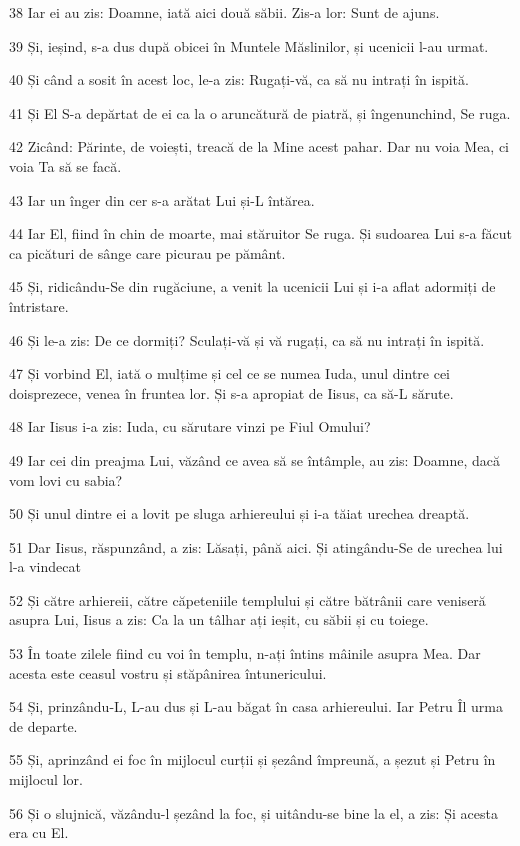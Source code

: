 \par 38 Iar ei au zis: Doamne, iată aici două săbii. Zis-a lor: Sunt de ajuns.
\par 39 Și, ieșind, s-a dus după obicei în Muntele Măslinilor, și ucenicii l-au urmat.
\par 40 Și când a sosit în acest loc, le-a zis: Rugați-vă, ca să nu intrați în ispită.
\par 41 Și El S-a depărtat de ei ca la o aruncătură de piatră, și îngenunchind, Se ruga.
\par 42 Zicând: Părinte, de voiești, treacă de la Mine acest pahar. Dar nu voia Mea, ci voia Ta să se facă.
\par 43 Iar un înger din cer s-a arătat Lui și-L întărea.
\par 44 Iar El, fiind în chin de moarte, mai stăruitor Se ruga. Și sudoarea Lui s-a făcut ca picături de sânge care picurau pe pământ.
\par 45 Și, ridicându-Se din rugăciune, a venit la ucenicii Lui și i-a aflat adormiți de întristare.
\par 46 Și le-a zis: De ce dormiți? Sculați-vă și vă rugați, ca să nu intrați în ispită.
\par 47 Și vorbind El, iată o mulțime și cel ce se numea Iuda, unul dintre cei doisprezece, venea în fruntea lor. Și s-a apropiat de Iisus, ca să-L sărute.
\par 48 Iar Iisus i-a zis: Iuda, cu sărutare vinzi pe Fiul Omului?
\par 49 Iar cei din preajma Lui, văzând ce avea să se întâmple, au zis: Doamne, dacă vom lovi cu sabia?
\par 50 Și unul dintre ei a lovit pe sluga arhiereului și i-a tăiat urechea dreaptă.
\par 51 Dar Iisus, răspunzând, a zis: Lăsați, până aici. Și atingându-Se de urechea lui l-a vindecat
\par 52 Și către arhiereii, către căpeteniile templului și către bătrânii care veniseră asupra Lui, Iisus a zis: Ca la un tâlhar ați ieșit, cu săbii și cu toiege.
\par 53 În toate zilele fiind cu voi în templu, n-ați întins mâinile asupra Mea. Dar acesta este ceasul vostru și stăpânirea întunericului.
\par 54 Și, prinzându-L, L-au dus și L-au băgat în casa arhiereului. Iar Petru Îl urma de departe.
\par 55 Și, aprinzând ei foc în mijlocul curții și șezând împreună, a șezut și Petru în mijlocul lor.
\par 56 Și o slujnică, văzându-l șezând la foc, și uitându-se bine la el, a zis: Și acesta era cu El.
